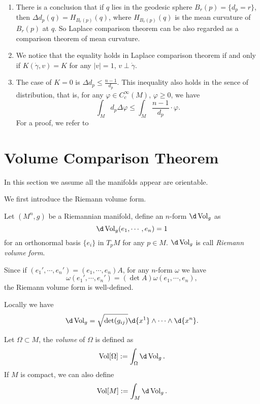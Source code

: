 \begin{rem}
    \begin{enumerate}[(1)]
        \item There is a conclusion that if $q$ lies in the geodesic sphere $B_r(p)=\{d_p=r\}$, then $\Delta d_p(q)=H_{B_r(p)}(q)$, where $H_{B_r(p)}(q)$ is the mean curvature of $B_r(p)$ at $q$.
        So Laplace comparison theorem can be also regarded as a comparison theorem of mean curvature.
        \item We notice that the equality holds in Laplace comparison theorem if and only if $K(\dot{\gamma},v)=K$ for any $|v|=1$, $v\perp\dot{\gamma}$.
        \item The case of $K=0$ is $\Delta d_p\leq\frac{n-1}{d_p}$.
        This inequality also holds in the sence of distribution, that is, for any $\varphi\in C^\infty_c(M)$, $\varphi\geq 0$, we have
        \[\int_Md_p\Delta\varphi\leq\int_M\frac{n-1}{d_p}\cdot\varphi.\]
        For a proof, we refer to~\cite[Chapter~1.~Proposition~1.1]{Shoen-Yau}
    \end{enumerate}
\end{rem}

\section{Volume Comparison Theorem}
In this section we assume all the manifolds appear are orientable.

We first introduce the Riemann volume form.
\begin{defn}
    Let $(M^n,g)$ be a Riemannian manifold, define an $n$-form $\d\Vol_g$ as 
    \[\d\Vol_g(e_1,\cdots,e_n)=1\]
    for an orthonormal basis $\{e_i\}$ in $T_pM$ for any $p\in M$.
    $\d\Vol_g$ is call \emph{Riemann volume form}.
\end{defn}

Since if $(e_1',\cdots,e_n')=(e_1,\cdots,e_n)A$, for any $n$-form $\omega$ we have
\[\omega(e_1',\cdots,e_n')=(\det{A})\omega(e_1,\cdots,e_n),\]
the Riemann volume form is well-defined.

Locally we have
\[\d\Vol_g=\sqrt{\det(g_{ij})}\d{x^1}\wedge\cdots\wedge\d{x^n}.\]

\begin{defn}
    Let $\Omega\subset M$, the \emph{volume} of $\Omega$ is defined as
    \[\Vol[\Omega]:=\int_\Omega\d\Vol_g.\]
    If $M$ is compact, we can also define
    \[\Vol[M]:=\int_M\d\Vol_g.\]
\end{defn}

